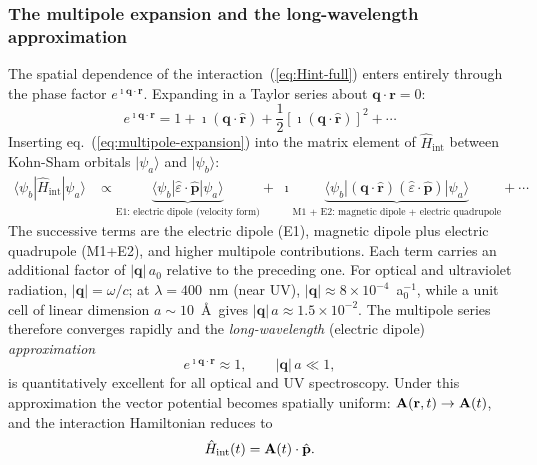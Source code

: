 \subsubsection{The multipole expansion and the long-wavelength approximation}
\label{sec:multipole}

The spatial dependence of the interaction~(\ref{eq:Hint-full}) enters
entirely through the phase factor $e^{\imath\mathbf{q}\cdot\mathbf{r}}$.
Expanding in a Taylor series about $\mathbf{q}\cdot\mathbf{r}=0$:
\begin{equation}
  e^{\imath\mathbf{q}\cdot\mathbf{r}}
  = 1
  + \imath(\mathbf{q}\cdot\hat{\mathbf{r}})
  + \frac{1}{2}\!\left[\imath(\mathbf{q}\cdot\hat{\mathbf{r}})\right]^2
  + \cdots
  \label{eq:multipole-expansion}
\end{equation}
Inserting eq.~(\ref{eq:multipole-expansion}) into the matrix element
of $\hat{H}_\mathrm{int}$ between Kohn-Sham orbitals $|\psi_a\rangle$
and $|\psi_b\rangle$:
\begin{align}
  \langle\psi_b|\hat{H}_\mathrm{int}|\psi_a\rangle
  &\propto
  \underbrace{
    \langle\psi_b|\hat{\varepsilon}\cdot\hat{\mathbf{p}}|\psi_a\rangle
  }_{\text{E1: electric dipole (velocity form)}}
  +\;\imath\!
  \underbrace{
    \langle\psi_b|(\mathbf{q}\cdot\hat{\mathbf{r}})
    (\hat{\varepsilon}\cdot\hat{\mathbf{p}})|\psi_a\rangle
  }_{\text{M1 + E2: magnetic dipole + electric quadrupole}}
  + \cdots
  \label{eq:multipole-me}
\end{align}
The successive terms are the electric dipole (E1), magnetic dipole
plus electric quadrupole (M1+E2), and higher multipole contributions.
Each term carries an additional factor of $|\mathbf{q}|\,a_0$ relative
to the preceding one.
For optical and ultraviolet radiation, $|\mathbf{q}| = \omega/c$;
at $\lambda = 400$~nm (near UV), $|\mathbf{q}| \approx 8\times10^{-4}$~a$_0^{-1}$,
while a unit cell of linear dimension $a \sim 10$~\AA\ gives
$|\mathbf{q}|\,a \approx 1.5\times10^{-2}$.
The multipole series therefore converges rapidly and the
\emph{long-wavelength} (electric dipole) \emph{approximation}
\begin{equation}
  e^{\imath\mathbf{q}\cdot\mathbf{r}} \approx 1,
  \qquad |\mathbf{q}|\,a \ll 1,
  \label{eq:LWA}
\end{equation}
is quantitatively excellent for all optical and UV spectroscopy.
Under this approximation the vector potential becomes spatially
uniform: $\mathbf{A}(\mathbf{r},t)\to\mathbf{A}(t)$, and the interaction
Hamiltonian reduces to
\begin{equation}
  \hat{H}_\mathrm{int}(t)
  = \mathbf{A}(t)\cdot\hat{\mathbf{p}}.
  \label{eq:Hint-LWA}
\end{equation}

